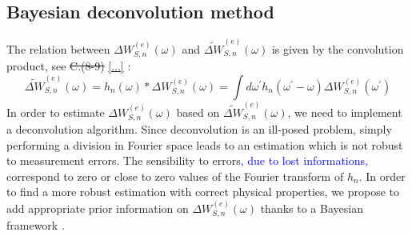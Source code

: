 \documentclass[aps,prb,superscriptaddress,preprint]{revtex4-1}
\begin{document}
	
	\subsection{Bayesian deconvolution method}
	
	The relation between $\Delta W^{(e)}_{S,n}(\omega)$ and $\widetilde{\Delta W}^{(e)}_{S,n}(\omega)$ is given by the convolution product, see \sout{C.(8-9)} \eqref{...} :
	\begin{equation}
	\widetilde{\Delta W}^{(e)}_{S,n}(\omega) = h_{n}(\omega)\ast\Delta W^{(e)}_{S,n}(\omega) = \int d\omega^{\prime}  h_{n}(\omega^{\prime}-\omega)\Delta W^{(e)}_{S,n}(\omega^{\prime})
	\label{eq:convolution}
	\end{equation}
	In order to estimate $\Delta W^{(e)}_{S,n}(\omega)$ based on $\widetilde{\Delta W}^{(e)}_{S,n}(\omega)$, we need to implement a deconvolution algorithm. Since deconvolution is an ill-posed problem, simply performing a division in Fourier space leads to an estimation which is not robust to measurement errors. The sensibility to errors\textcolor{blue}{, due to lost informations,} correspond to zero or close to zero values of the Fourier transform of $h_{n}$. In order to find a more robust estimation with correct physical properties, we propose to add appropriate prior information on $\Delta W^{(e)}_{S,n}(\omega)$ thanks to a Bayesian framework \cite{Ayasso2010,Djafari2015,Zhao2016}.
	
\end{document}
